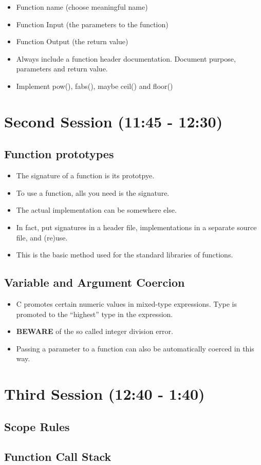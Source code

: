 \documentclass[11pt]{article}
\begin{document}
\begin{itemize}
\item Function name (choose meaningful name)
\item Function Input (the parameters to the function)
\item Function Output (the return value)
\item Always include a function header documentation.  Document purpose,
  parameters and return value.
\item Implement pow(), fabs(), maybe ceil() and floor()
\end{itemize}
\section{Second Session (11:45 - 12:30)}
\label{sec-2}
\subsection{Function prototypes}
\label{sec-2-1}

\begin{itemize}
\item The signature of a function is its prototpye.
\item To use a function, alls you need is the signature.
\item The actual implementation can be somewhere else.
\item In fact, put signatures in a header file, implementations in a separate source file, and (re)use.
\item This is the basic method used for the standard libraries of functions.
\end{itemize}
\subsection{Variable and Argument Coercion}
\label{sec-2-2}


\begin{itemize}
\item C promotes certain numeric values in mixed-type expressions.  Type
  is promoted to the ``highest'' type in the expression.
\item \textbf{BEWARE} of the so called integer division error.
\item Passing a parameter to a function can also be automatically coerced in this way.
\end{itemize}
\section{Third Session (12:40 - 1:40)}
\label{sec-3}
\subsection{Scope Rules}
\label{sec-3-1}
\subsection{Function Call Stack}
\label{sec-3-2}
\end{document}

